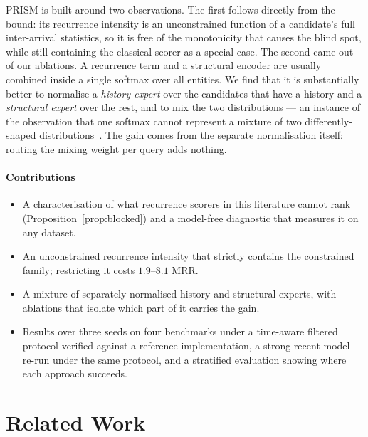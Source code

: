 \documentclass[conference]{IEEEtran}
\begin{document}
PRISM is built around two observations. The first follows directly from the
bound: its recurrence intensity is an unconstrained function of a candidate's
full inter-arrival statistics, so it is free of the monotonicity that causes
the blind spot, while still containing the classical scorer as a special case.
The second came out of our ablations. A recurrence term and a structural
encoder are usually combined inside a single softmax over all entities. We
find that it is substantially better to normalise a \emph{history expert} over
the candidates that have a history and a \emph{structural expert} over the rest,
and to mix the two distributions --- an instance of the observation that one
softmax cannot represent a mixture of two differently-shaped
distributions~\cite{mos}. The gain comes from the separate normalisation
itself: routing the mixing weight per query adds nothing.

\paragraph{Contributions}
\begin{itemize}
  \item A characterisation of what recurrence scorers in this literature cannot
        rank (Proposition~\ref{prop:blocked}) and a model-free diagnostic that
        measures it on any dataset.
  \item An unconstrained recurrence intensity that strictly contains the
        constrained family; restricting it costs $1.9$--$8.1$ MRR.
  \item A mixture of separately normalised history and structural experts,
        with ablations that isolate which part of it carries the gain.
  \item Results over three seeds on four benchmarks under a time-aware
        filtered protocol verified against a reference implementation, a
        strong recent model re-run under the same protocol, and a stratified
        evaluation showing where each approach succeeds.
\end{itemize}

\section{Related Work}
\label{sec:related}
\end{document}
